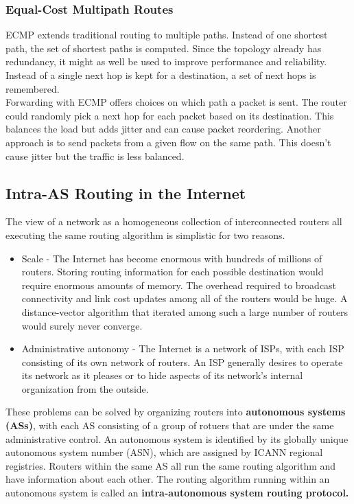 \subsubsection{Equal-Cost Multipath Routes}
ECMP extends traditional routing to multiple paths. Instead of one shortest path, the set of shortest paths is computed. Since the topology already has redundancy, it might as well be used to improve performance and reliability. Instead of a single next hop is kept for a destination, a set of next hops is remembered.\\
Forwarding with ECMP offers choices on which path a packet is sent. The router could randomly pick a next hop for each packet based on its destination. This balances the load but adds jitter and can cause packet reordering. Another approach is to send packets from a given flow on the same path. This doesn't cause jitter but the traffic is less balanced.

\subsection{Intra-AS Routing in the Internet}
The view of a network as a homogeneous collection of interconnected routers all executing the same routing algorithm is simplistic for two reasons. 
\begin{itemize}
\item Scale - The Internet has become enormous with hundreds of millions of routers. Storing routing information for each possible destination would require enormous amounts of memory. The overhead required to broadcast connectivity and link cost updates among all of the routers would be huge. A distance-vector algorithm that iterated among such a large number of routers would surely never converge.
\item Administrative autonomy - The Internet is a network of ISPs, with each ISP consisting of its own network of routers. An ISP generally desires to operate its network as it pleases or to hide aspects of its network's internal organization from the outside.
\end{itemize}
These problems can be solved by organizing routers into \textbf{autonomous systems (ASs)}, with each AS consisting of a group of rotuers that are under the same administrative control. An autonomous system is identified by its globally unique autonomous system number (ASN), which are assigned by ICANN regional registries. Routers within the same AS all run the same routing algorithm and have information about each other. The routing algorithm running within an autonomous system is called an \textbf{intra-autonomous system routing protocol.}

